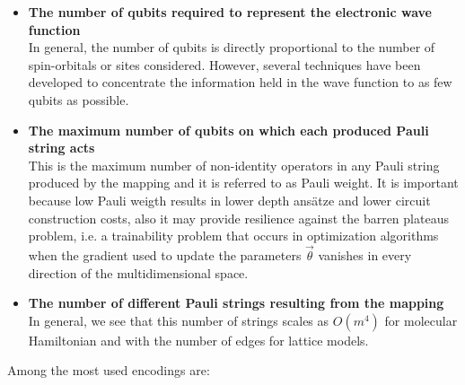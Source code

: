 \begin{itemize}
    \item \textbf{The number of qubits required to represent the electronic wave function} \\
    In general, the number of qubits is directly proportional to the number of spin-orbitals or sites considered. However, several techniques have been developed to concentrate the information held in the wave function to as few qubits as possible.
    
    \item \textbf{The maximum number of qubits on which each produced Pauli string acts} \\
    This is the maximum number of non-identity operators in any Pauli string produced by the mapping and it is referred to as Pauli weight.
    It is important because low Pauli weigth results in lower depth ansätze and lower circuit construction costs, also it may provide resilience against the barren plateaus problem, i.e. a trainability problem that occurs in optimization algorithms when the gradient used to update the parameters $\vec{\theta}$ vanishes in every direction of the multidimensional space.
    
    \item \textbf{The number of different Pauli strings resulting from the mapping} \\
    In general, we see that this number of strings scales as $O(m^4)$ for molecular Hamiltonian and with the number of edges for lattice models.
\end{itemize}
Among the most used encodings are:
